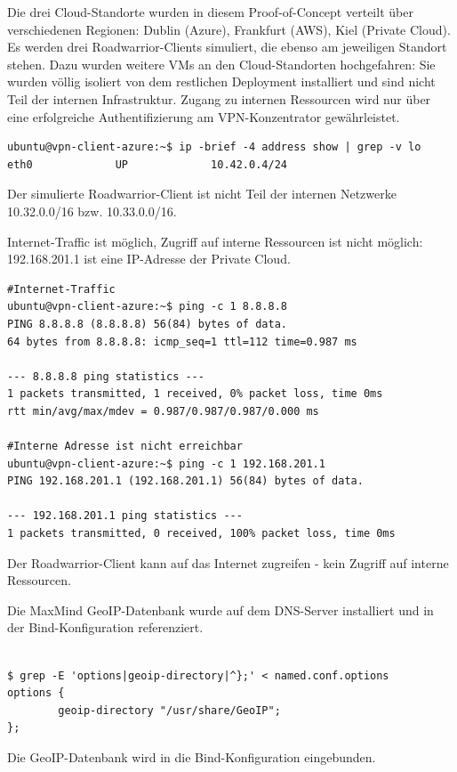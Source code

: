 Die drei Cloud-Standorte wurden in diesem Proof-of-Concept verteilt über verschiedenen Regionen: Dublin (Azure), Frankfurt (AWS), Kiel (Private Cloud). Es werden drei Roadwarrior-Clients simuliert, die ebenso am jeweiligen Standort stehen. Dazu wurden weitere VMs an den Cloud-Standorten hochgefahren: Sie wurden völlig isoliert von dem restlichen Deployment installiert und sind nicht Teil der internen Infrastruktur. Zugang zu internen Ressourcen wird nur über eine erfolgreiche Authentifizierung am VPN-Konzentrator gewährleistet.
\begin{listing}[h]
\begin{verbatim}
ubuntu@vpn-client-azure:~$ ip -brief -4 address show | grep -v lo
eth0             UP             10.42.0.4/24

\end{verbatim}
\caption{Der simulierte Roadwarrior-Client ist nicht Teil der internen Netzwerke 10.32.0.0/16 bzw. 10.33.0.0/16.}
\label{ext-ip-addr-roadwarrior}
\end{listing}\FloatBarrier
Internet-Traffic ist möglich, Zugriff auf interne Ressourcen ist nicht möglich: 192.168.201.1 ist eine IP-Adresse der Private Cloud.
\begin{listing}[h]
\begin{verbatim}
#Internet-Traffic
ubuntu@vpn-client-azure:~$ ping -c 1 8.8.8.8
PING 8.8.8.8 (8.8.8.8) 56(84) bytes of data.
64 bytes from 8.8.8.8: icmp_seq=1 ttl=112 time=0.987 ms

--- 8.8.8.8 ping statistics ---
1 packets transmitted, 1 received, 0% packet loss, time 0ms
rtt min/avg/max/mdev = 0.987/0.987/0.987/0.000 ms

#Interne Adresse ist nicht erreichbar 
ubuntu@vpn-client-azure:~$ ping -c 1 192.168.201.1
PING 192.168.201.1 (192.168.201.1) 56(84) bytes of data.

--- 192.168.201.1 ping statistics ---
1 packets transmitted, 0 received, 100% packet loss, time 0ms

\end{verbatim}
\caption{Der Roadwarrior-Client kann auf das Internet zugreifen - kein Zugriff auf interne Ressourcen.}
\label{internet-access-roadwarrior}
\end{listing}\FloatBarrier
Die MaxMind GeoIP-Datenbank wurde auf dem DNS-Server installiert und in der Bind-Konfiguration referenziert.
\begin{listing}[h]
\begin{verbatim}

$ grep -E 'options|geoip-directory|^};' < named.conf.options
options {
        geoip-directory "/usr/share/GeoIP";
};

\end{verbatim}
\caption{Die GeoIP-Datenbank wird in die Bind-Konfiguration eingebunden.}
\label{bind-geoip-directory}
\end{listing}\FloatBarrier
